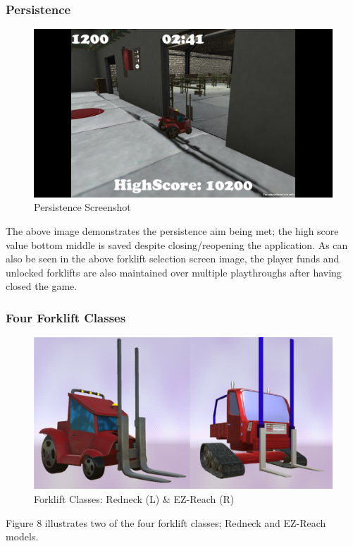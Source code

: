 \documentclass[12pt]{article}
\begin{document}
\subsubsection{Persistence}
\begin{figure}[H]
	\caption{Persistence Screenshot}
	\includegraphics[width=\textwidth]{images/score}
\end{figure}
The above image demonstrates the persistence aim being met; the high score value bottom middle is saved despite closing/reopening the application. As can also be seen in the above forklift selection screen image, the player funds and unlocked forklifts are also maintained over multiple playthroughs after having closed the game.

\subsubsection{Four Forklift Classes}
\begin{figure}[H]
	\caption{Forklift Classes: Redneck (L) \& EZ-Reach (R)}
	\includegraphics[width=\textwidth]{images/redneckEZ}
\end{figure}
Figure 8 illustrates two of the four forklift classes; Redneck and EZ-Reach models.
\end{document}
